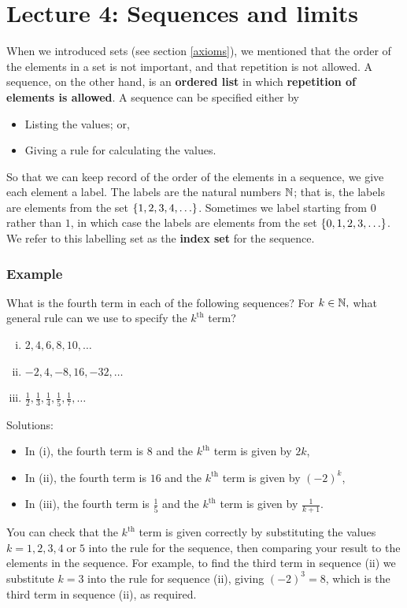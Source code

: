 \chapter{Lecture 4: Sequences and limits}
When we introduced sets (see section \ref{axioms}), we mentioned that the order of the elements in a set is not important, and that repetition is not allowed. A sequence, on the other hand, is an \textbf{ordered list} in which \textbf{repetition of elements is allowed}. A sequence can be specified either by \label{sequence}
\begin{itemize}
\item
Listing the values; or,
\item
Giving a rule for calculating the values.
\end{itemize}
So that we can keep record of the order of the elements in a sequence, we give each element a label. The labels are the natural numbers $\mathbb{N}$; that is, the labels are elements from the set $\left\{1,2,3,4,\ldots\right\}$. Sometimes we label starting from $0$ rather than $1$, in which case the labels are elements from the set $\left\{0,1,2,3,\ldots\right\}$. We refer to this labelling set as the \textbf{index set} for the sequence. \label{index set}

\subsection{Example} \label{example4}
What is the fourth term in each of the following sequences? For $k \in \mathbb{N},$ what general rule can we use to specify the $k^{\text{th}}$ term? 
\begin{enumerate}[(i)]
\item $2,4,6,8,10,\ldots$
\item $-2,4,-8,16,-32,\ldots$
\item $\displaystyle{\frac{1}{2},\frac{1}{3},\frac{1}{4},\frac{1}{5},\frac{1}{7},\ldots}$
\end{enumerate}
Solutions:
\begin{itemize}
\item In (i), the fourth term is $8$ and the $k^{\text{th}}$ term is given by $2k$,
\item In (ii), the fourth term is $16$ and the $k^{\text{th}}$ term is given by $(-2)^k$,
\item In (iii), the fourth term is $\frac{1}{5}$ and the $k^{\text{th}}$ term is given by $\displaystyle{\frac{1}{k+1}}$.
\end{itemize}
You can check that the $k^{\text{th}}$ term is given correctly by substituting the values $k = 1,2,3,4 \; \text{or} \; 5$ into the rule for the sequence, then comparing your result to the elements in the sequence. For example, to find the third term in sequence (ii) we substitute $k = 3$ into the rule for sequence (ii), giving $(-2)^3 = 8$, which is the third term in sequence (ii), as required.

